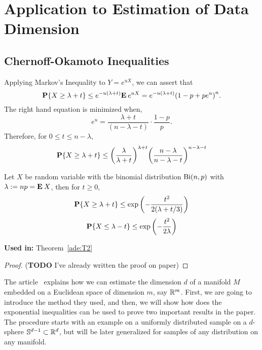 \chapter{Application to Estimation of Data Dimension}

\section{Chernoff-Okamoto Inequalities}

Applying Markov's Inequality to $Y = e^{uX}$, we can assert that
  \[
    \P\{X \geq \lambda + t\} \leq e^{-u(\lambda+t)} \E e^{uX} = e^{-u(\lambda+ t)} {(1-p + p e^{u})}^n. 
  \] 
  The right hand equation is minimized when,
  \[ e^{u} = \frac{\lambda+t}{(n-\lambda-t)} \cdot \frac{1-p}{p}. \]
  Therefore, for $0 \leq t \leq n-\lambda$,
  \begin{equation}\label{co:1}
    \P\{X \geq \lambda + t\} \leq {\left(\frac{\lambda}{\lambda+t}\right)}^{\lambda + t} {\left(\frac{n-\lambda}{n-\lambda-t}\right)}^{n - \lambda - t}
  \end{equation}

\begin{theorem}\label{co:T1}
  Let $X$ be random variable with the binomial distribution $\Bi(n,p)$ with $\lambda := np = \E X$, then for $t \geq 0$,
  \begin{equation}\label{co:2}
    \P\{X \geq \lambda + t\} \leq \exp\left(- \frac{t^2}{2(\lambda+t/3)}\right)
  \end{equation}
  \begin{equation}\label{co:3}
    \P\{X \leq \lambda - t\} \leq \exp\left(- \frac{t^2}{2\lambda}\right)
  \end{equation}
\end{theorem}

\textbf{Used in:} Theorem~\ref{ade:T2}

\begin{proof}
  (\textbf{TODO} I've already written the proof on paper)
\end{proof}

The article~\cite{diaz2019local} explains how we can estimate the dimension $d$ of a manifold $M$ embedded on a Euclidean space of dimension $m$, say $\R^m$. First, we are going to introduce the method they used, and then, we will show how does the exponential inequalities can be used to prove two important results in the paper. The procedure starts with an example on a uniformly distributed sample on a $d$-sphere $\S^{d-1} \subset \R^d$, but will be later generalized for samples of any distribution on any manifold.\\[1em]

